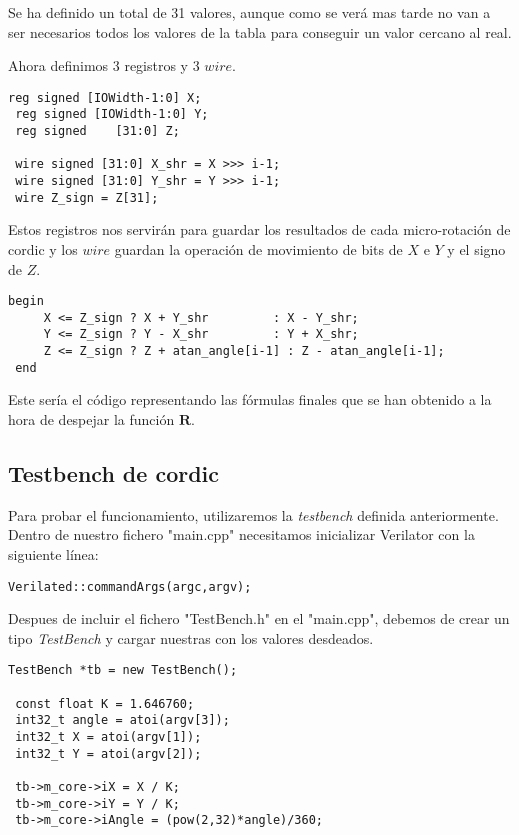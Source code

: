 Se ha definido un total de 31 valores, aunque como se verá mas tarde no van a ser necesarios todos los valores de la tabla para conseguir un valor cercano al real.

Ahora definimos 3 registros y 3 $wire$.

\begin{lstlisting}[caption={Registros y $wire$ para operar con \gls{cordic}}]
 reg signed [IOWidth-1:0] X;
 reg signed [IOWidth-1:0] Y;
 reg signed    [31:0] Z; 
 
 wire signed [31:0] X_shr = X >>> i-1;
 wire signed [31:0] Y_shr = Y >>> i-1;
 wire Z_sign = Z[31];  
\end{lstlisting}

Estos registros nos servirán para guardar los resultados de cada micro-rotación de \gls{cordic} y los $wire$ guardan la operación de movimiento de bits de $X$ e $Y$ y el signo de $Z$.

\begin{lstlisting}[caption={Bucle principal de \gls{cordic}}]
 begin
     X <= Z_sign ? X + Y_shr         : X - Y_shr;
     Y <= Z_sign ? Y - X_shr         : Y + X_shr;
     Z <= Z_sign ? Z + atan_angle[i-1] : Z - atan_angle[i-1];
 end
\end{lstlisting}

Este sería el código representando las fórmulas finales que se han obtenido a la hora de despejar la función $\textbf{R}$.

\subsection{Testbench de \gls{cordic}}
Para probar el funcionamiento, utilizaremos la \textit{testbench} definida anteriormente. Dentro de nuestro fichero "main.cpp" necesitamos inicializar Verilator con la siguiente línea:

\begin{lstlisting}
Verilated::commandArgs(argc,argv);
\end{lstlisting}

Despues de incluir el fichero "TestBench.h" en el "main.cpp", debemos de crear un tipo \textit{TestBench} y cargar nuestras con los valores desdeados.

\begin{lstlisting}[caption={Creación del tipo TestBench y entrada de valores desde C++ al módulo de \gls{cordic} en Verilog}]
 TestBench *tb = new TestBench();

 const float K = 1.646760;
 int32_t angle = atoi(argv[3]);
 int32_t X = atoi(argv[1]);
 int32_t Y = atoi(argv[2]);

 tb->m_core->iX = X / K;
 tb->m_core->iY = Y / K;
 tb->m_core->iAngle = (pow(2,32)*angle)/360;
\end{lstlisting} 

